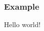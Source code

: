 \documentclass{beamer}
\begin{document}
\begin{frame}
  \frametitle{Example}
  Hello world!
\end{frame}
\end{document}

